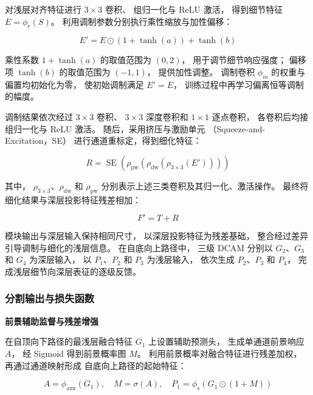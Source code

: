 对浅层对齐特征进行 \(3\times3\) 卷积、
组归一化与 ReLU 激活，
得到细节特征 \(E=\phi_e(S)\)。
利用调制参数分别执行乘性缩放与加性偏移：

\begin{equation}
E'=E\odot\left(1+\tanh(a)\right)+\tanh(b)
\label{eq:dcam-modulation}
\end{equation}

乘性系数 \(1+\tanh(a)\)
的取值范围为 \((0,2)\)，
用于调节细节响应强度；
偏移项 \(\tanh(b)\)
的取值范围为 \((-1,1)\)，
提供加性调整。
调制卷积 \(\phi_m\) 的权重与偏置均初始化为零，
使初始调制满足 \(E'=E\)，
训练过程中再学习偏离恒等调制的幅度。

调制结果依次经过 \(3\times3\) 卷积、
\(3\times3\) 深度卷积和 \(1\times1\) 逐点卷积，
各卷积后均接组归一化与 ReLU 激活。
随后，采用挤压与激励单元
（Squeeze-and-Excitation，SE）
进行通道重标定，得到细化特征：

\begin{equation}
R=\operatorname{SE}\left(
\rho_{\mathrm{pw}}\left(
\rho_{\mathrm{dw}}\left(
\rho_{3\times3}(E')
\right)\right)\right)
\label{eq:dcam-refinement}
\end{equation}

其中，
\(\rho_{3\times3}\)、\(\rho_{\mathrm{dw}}\)
和 \(\rho_{\mathrm{pw}}\)
分别表示上述三类卷积及其归一化、激活操作。
最终将细化结果与深层投影特征残差相加：

\begin{equation}
F'=T+R
\label{eq:dcam-output}
\end{equation}

模块输出与深层输入保持相同尺寸，
以深层投影特征为残差基础，
整合经过差异引导调制与细化的浅层信息。
在自底向上路径中，
三级 DCAM 分别以
\(G_2\)、\(G_3\) 和 \(G_4\) 为深层输入，
以 \(P_1\)、\(P_2\) 和 \(P_3\) 为浅层输入，
依次生成 \(P_2\)、\(P_3\) 和 \(P_4\)，
完成浅层细节向深层表征的逐级反馈。

\subsubsection{分割输出与损失函数}

\noindent\textbf{前景辅助监督与残差增强}\par

在自顶向下路径的最浅层融合特征 \(G_1\)
上设置辅助预测头，
生成单通道前景响应 \(A\)，
经 Sigmoid 得到前景概率图 \(M\)。
利用前景概率对融合特征进行残差加权，
再通过通道映射形成
自底向上路径的起始特征：

\begin{equation}
A=\phi_{\mathrm{aux}}(G_1),\quad
M=\sigma(A),\quad
P_1=\phi_s\left(G_1\odot(1+M)\right)
\label{eq:prediction-foreground}
\end{equation}

